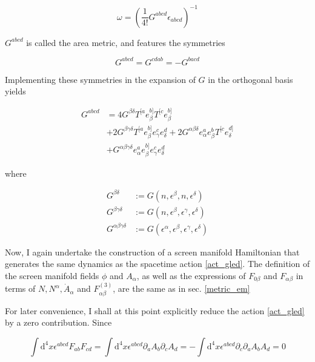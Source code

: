 \documentclass[11pt]{article}
\begin{document}
\begin{equation}
	\omega = \left( \frac{1}{4 !} G^{a b c d} \epsilon_{a b c d} \right)^{-1}
\end{equation}

 $G^{a b c d}$ is called the area metric, and features the symmetries

\begin{equation}
	G^{a b c d} = G^{c d a b} = - G^{b a c d}	
\end{equation}

Implementing these symmetries in the expansion of $G$ in the orthogonal basis yields 

\begin{equation}
	\begin{split}
		G^{a b c d} 
		&= 4 G^{\beta \delta} T^{[a} e_\beta^{b]} T^{[c} e_\beta^{b]}\\
		&+ 2 G^{\beta \gamma \delta} T^{[a} e_\beta^{b]} e_\gamma^{c} e_\delta^{d}
		+ 2 G^{\alpha \beta \delta} e_\alpha^a e_\beta^{b} T^{[c} e_\delta^{d]}\\
		&+ G^{\alpha \beta \gamma \delta} e_\alpha^a e_\beta^{b]} e_\gamma^{c} e_\delta^{d}
	\end{split}   
\end{equation}

where

\begin{align}
	G^{\beta \delta} 
	&:= G \left( n, \epsilon^\beta, n, \epsilon^\delta \right)\\
	G^{\beta \gamma \delta} 
	&:= G \left( n, \epsilon^\beta, \epsilon^\gamma, \epsilon^\delta \right)\\
	G^{\alpha \beta \gamma \delta} 
	&:= G \left( \epsilon^\alpha, \epsilon^\beta, \epsilon^\gamma, \epsilon^\delta \right)
\end{align}

Now, I again undertake the construction of a screen manifold Hamiltonian that generates the same dynamics as the spacetime action \ref{act_gled}. The definition of the screen manifold fields $\phi$ and $A_\alpha$, as well as the expressions of $F_{ 0 \beta}$ and $F_{\alpha \beta}$ in terms of $N, N^\alpha, \dot{A}_\alpha$ and $F^{(3)}_{\alpha \beta}$, are the same as in sec. \ref{metric_em}

For later convenience, I shall at this point explicitly reduce the action \ref{act_gled} by a zero contribution. Since

\begin{equation}
	\int \mathrm{d}^4 x \epsilon^{a b c d} F_{a b} F_{c d} 
	= \int \mathrm{d}^4 x \epsilon^{a b c d} \partial_a A_b \partial_c A_d
	= - \int \mathrm{d}^4 x \epsilon^{a b c d} \partial_c \partial_a A_b A_d
	= 0
\end{equation}
\end{document}

